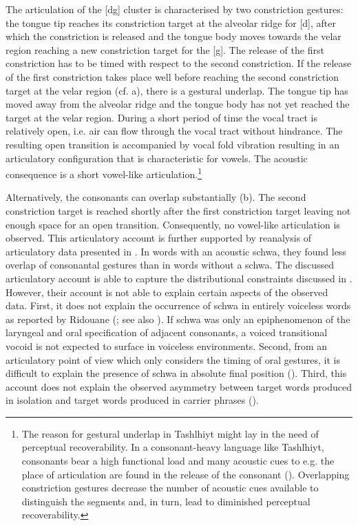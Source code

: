 The articulation of the [dg] cluster is characterised by two constriction gestures: the tongue tip reaches its constriction target at the alveolar ridge for [d], after which the constriction is released and the tongue body moves towards the velar region reaching a new constriction target for the [g]. The release of the first constriction has to be timed with respect to the second constriction. If the release of the first constriction takes place well before reaching the second constriction target at the velar region (cf. a), there is a gestural underlap. The tongue tip has moved away from the alveolar ridge and the tongue body has not yet reached the target at the velar region. During a short period of time the vocal tract is relatively open, i.e. air can flow through the vocal tract without hindrance. The resulting open transition is accompanied by vocal fold vibration resulting in an articulatory configuration that is characteristic for vowels. The acoustic consequence is a short vowel-like articulation.\footnote{The reason for gestural underlap in Tashlhiyt might lay in the need of perceptual recoverability. In a consonant-heavy language like Tashlhiyt, consonants bear a high functional load and many acoustic cues to e.g. the place of articulation are found in the release of the consonant (\citealt{Householder1956,Malecot1958,Wang1959,Fujimura.etal1978,Ohala1990}). Overlapping constriction gestures decrease the number of acoustic cues available to distinguish the segments and, in turn, lead to diminished perceptual recoverability.} 

Alternatively, the consonants can overlap substantially (b). The second constriction target is reached shortly after the first constriction target leaving not enough space for an open transition. Consequently, no vowel-like articulation is observed. This articulatory account is further supported by  reanalysis of articulatory data presented in \citet{FougeronRidouane2008}. In words with an acoustic schwa, they found less overlap of consonantal gestures than in words without a schwa. The discussed articulatory account is able to capture the distributional constraints discussed in \citet{RidouaneFougeron2011}. However, their account is not able to explain certain aspects of the observed data. First, it does not explain the occurrence of schwa in entirely voiceless words as reported by Ridouane (\citeyear{Ridouane2008}; see also \citealt{LoualiPuech2000}). If schwa was only an epiphenomenon of the laryngeal and oral specification of adjacent consonants, a voiced transitional vocoid is not expected to surface in voiceless environments. Second, from an articulatory point of view which only considers the timing of oral gestures, it is difficult to explain the presence of schwa in absolute final position (\citealt{LoualiPuech2000,Ridouane2008}). Third, this account does not explain the observed asymmetry between target words produced in isolation and target words produced in carrier phrases (\citealt{Ridouane2008}).  

